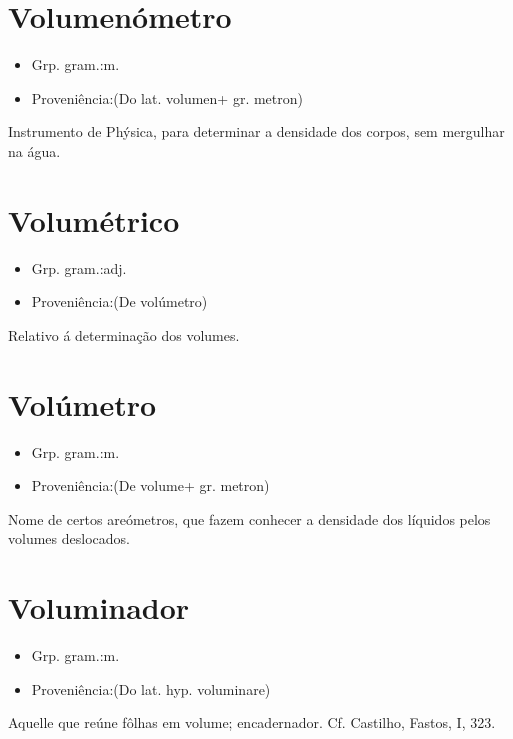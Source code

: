 \documentclass{article}
\begin{document}
\section{Volumenómetro}
\begin{itemize}
\item {Grp. gram.:m.}
\end{itemize}
\begin{itemize}
\item {Proveniência:(Do lat. \textunderscore volumen\textunderscore  + gr. \textunderscore metron\textunderscore )}
\end{itemize}
Instrumento de Phýsica, para determinar a densidade dos corpos, sem mergulhar na água.
\section{Volumétrico}
\begin{itemize}
\item {Grp. gram.:adj.}
\end{itemize}
\begin{itemize}
\item {Proveniência:(De \textunderscore volúmetro\textunderscore )}
\end{itemize}
Relativo á determinação dos volumes.
\section{Volúmetro}
\begin{itemize}
\item {Grp. gram.:m.}
\end{itemize}
\begin{itemize}
\item {Proveniência:(De \textunderscore volume\textunderscore  + gr. \textunderscore metron\textunderscore )}
\end{itemize}
Nome de certos areómetros, que fazem conhecer a densidade dos líquidos pelos volumes deslocados.
\section{Voluminador}
\begin{itemize}
\item {Grp. gram.:m.}
\end{itemize}
\begin{itemize}
\item {Proveniência:(Do lat. hyp. \textunderscore voluminare\textunderscore )}
\end{itemize}
Aquelle que reúne fôlhas em volume; encadernador. Cf. Castilho, \textunderscore Fastos\textunderscore , I, 323.
\end{document}
